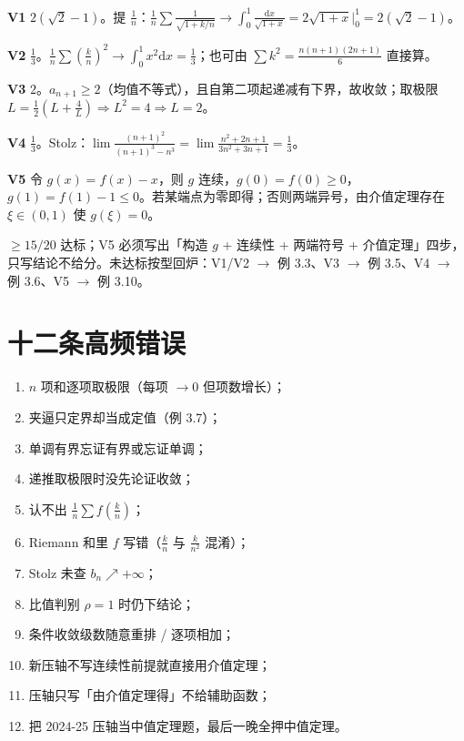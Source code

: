 \documentclass[11pt,a4paper]{ctexart}
\newcommand{\D}{\mathrm{d}}
\begin{document}
\textbf{V1} $2(\sqrt2-1)$。提 $\frac1n$：$\frac1n\sum\frac1{\sqrt{1+k/n}}\to\int_0^1\frac{\D x}{\sqrt{1+x}}=2\sqrt{1+x}\big|_0^1=2(\sqrt2-1)$。

\textbf{V2} $\frac13$。$\frac1n\sum(\frac kn)^2\to\int_0^1x^2\D x=\frac13$；也可由 $\sum k^2=\frac{n(n+1)(2n+1)}6$ 直接算。

\textbf{V3} $2$。$a_{n+1}\ge2$（均值不等式），且自第二项起递减有下界，故收敛；取极限 $L=\frac12(L+\frac4L)\Rightarrow L^2=4\Rightarrow L=2$。

\textbf{V4} $\frac13$。Stolz：$\lim\frac{(n+1)^2}{(n+1)^3-n^3}=\lim\frac{n^2+2n+1}{3n^2+3n+1}=\frac13$。

\textbf{V5} 令 $g(x)=f(x)-x$，则 $g$ 连续，$g(0)=f(0)\ge0$，$g(1)=f(1)-1\le0$。若某端点为零即得；否则两端异号，由介值定理存在 $\xi\in(0,1)$ 使 $g(\xi)=0$。

\begin{warnbox}[验收线]
$\ge 15/20$ 达标；V5 必须写出「构造 $g$ + 连续性 + 两端符号 + 介值定理」四步，只写结论不给分。未达标按型回炉：V1/V2 $\to$ 例 3.3、V3 $\to$ 例 3.5、V4 $\to$ 例 3.6、V5 $\to$ 例 3.10。
\end{warnbox}

\section{十二条高频错误}

\begin{enumerate}[label=\arabic*.,leftmargin=2em]
\item $n$ 项和逐项取极限（每项 $\to0$ 但项数增长）；\item 夹逼只定界却当成定值（例 3.7）；
\item 单调有界忘证有界或忘证单调；\item 递推取极限时没先论证收敛；
\item 认不出 $\frac1n\sum f(\frac kn)$；\item Riemann 和里 $f$ 写错（$\frac kn$ 与 $\frac k{n^2}$ 混淆）；
\item Stolz 未查 $b_n\nearrow+\infty$；\item 比值判别 $\rho=1$ 时仍下结论；
\item 条件收敛级数随意重排 / 逐项相加；\item 新压轴不写连续性前提就直接用介值定理；
\item 压轴只写「由介值定理得」不给辅助函数；\item 把 2024-25 压轴当中值定理题，最后一晚全押中值定理。
\end{enumerate}
\end{document}
